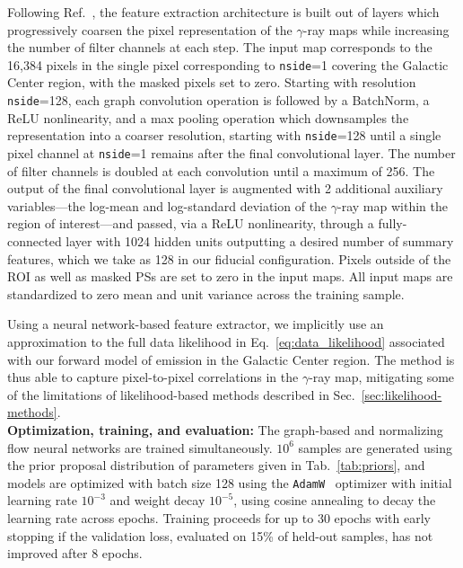 \documentclass[prd,aps,10pt,nofootinbib,twocolumn,superscriptaddress,preprintnumbers,balancelastpage,longbibliography]{revtex4-1}
\begin{document}
Following Ref.~\cite{Perraudin:2018rbt}, the feature extraction architecture is built out of layers which progressively coarsen the pixel representation of the $\gamma$-ray maps while increasing the number of filter channels at each step. The input map corresponds to the 16,384 pixels in the single pixel corresponding to \texttt{nside}=1 covering the Galactic Center region, with the masked pixels set to zero. Starting with \HEALPix resolution \texttt{nside}=128, each graph convolution operation is followed by a BatchNorm, a ReLU nonlinearity, and a max pooling operation which downsamples the representation into a coarser resolution, starting with \texttt{nside}=128 until a single pixel channel at \texttt{nside}=1 remains after the final convolutional layer. The number of filter channels is doubled at each convolution until a maximum of 256. The output of the final convolutional layer is augmented with 2 additional auxiliary variables---the log-mean and log-standard deviation of the $\gamma$-ray map within the region of interest---and passed, via a ReLU nonlinearity, through a fully-connected layer with 1024 hidden units outputting a desired number of summary features, which we take as 128 in our fiducial configuration. Pixels outside of the ROI as well as masked PSs are set to zero in the input maps. All input maps are standardized to zero mean and unit variance across the training sample.

Using a neural network-based feature extractor, we implicitly use an approximation to the full data likelihood in Eq.~\eqref{eq:data_likelihood} associated with our forward model of emission in the Galactic Center region. The method is thus able to capture pixel-to-pixel correlations in the $\gamma$-ray map, mitigating some of the limitations of likelihood-based methods described in Sec.~\ref{sec:likelihood-methods}. \\

\noindent
\textbf{Optimization, training, and evaluation:} The graph-based and normalizing flow neural networks are trained simultaneously. $10^{6}$ samples are generated using the prior proposal distribution of parameters given in Tab.~\ref{tab:priors}, and models are optimized with batch size 128 using the \texttt{AdamW}~\cite{KingmaB14,loshchilov2018decoupled} optimizer with initial learning rate $10^{-3}$ and weight decay $10^{-5}$, using cosine annealing to decay the learning rate across epochs. Training proceeds for up to 30 epochs with early stopping if the validation loss, evaluated on 15\% of held-out samples, has not improved after 8 epochs. 
\end{document}
